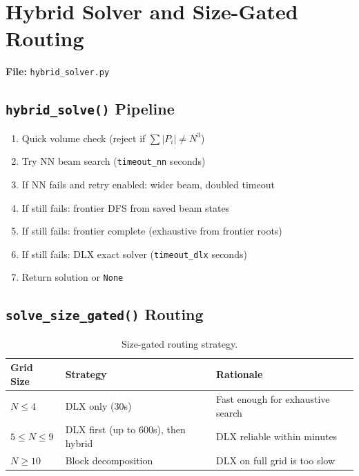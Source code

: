 \documentclass[11pt]{article}
\begin{document}
\section{Hybrid Solver and Size-Gated Routing}

\textbf{File:} \texttt{hybrid\_solver.py}

\subsection{\texttt{hybrid\_solve()} Pipeline}

\begin{enumerate}[nosep]
  \item Quick volume check (reject if $\sum|P_i| \neq N^3$)
  \item Try NN beam search (\texttt{timeout\_nn} seconds)
  \item If NN fails and retry enabled: wider beam, doubled timeout
  \item If still fails: frontier DFS from saved beam states
  \item If still fails: frontier complete (exhaustive from frontier roots)
  \item If still fails: DLX exact solver (\texttt{timeout\_dlx} seconds)
  \item Return solution or \texttt{None}
\end{enumerate}

\subsection{\texttt{solve\_size\_gated()} Routing}

\begin{table}[H]
\centering
\begin{tabular}{@{}lll@{}}
\toprule
\textbf{Grid Size} & \textbf{Strategy} & \textbf{Rationale} \\
\midrule
$N \leq 4$ & DLX only (30s) & Fast enough for exhaustive search \\
$5 \leq N \leq 9$ & DLX first (up to 600s), then hybrid & DLX reliable within minutes \\
$N \geq 10$ & Block decomposition & DLX on full grid is too slow \\
\bottomrule
\end{tabular}
\caption{Size-gated routing strategy.}
\end{table}
\end{document}
